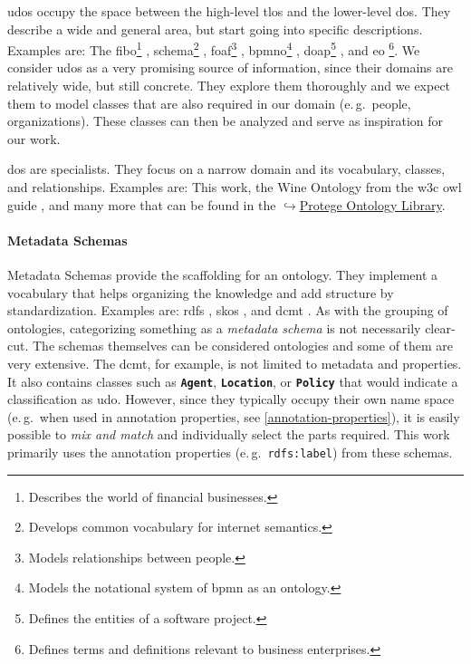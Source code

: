 \documentclass[a4paper, DIV=13, BCOR=0cm]{scrbook}
\newcommand{\eg}{e.\,g.\ }
\newcommand{\class}[1]{\texttt{\textbf{#1}}}
\newcommand{\relation}[1]{\texttt{#1}}
\newcommand{\link}[2]{\href{#1}{$\hookrightarrow$#2}}
\begin{document}
\glspl{udo} occupy the space between the high-level \glspl{tlo} and the lower-level \glspl{do}. They describe a wide and general area, but start going into specific descriptions. Examples are: The %
	\gls{fibo}\footnote{Describes the world of financial businesses.} \cite{fibo-ontology},
	\gls{schema}\footnote{Develops common vocabulary for internet semantics.} \cite{schema-ontology},
	\gls{foaf}\footnote{Models relationships between people.} \cite{Dan-Brickley2014FOAF-Vocabulary},
	\gls{bpmno}\footnote{Models the notational system of \gls{bpmn} as an ontology.} \cite{2014foisbpmn},
	\gls{doap}\footnote{Defines the entities of a software project.} \cite{doap-ontology},
	and \gls{eo} \cite{enterprise-ontology}\footnote{Defines terms and definitions relevant to business enterprises.}.%
We consider \glspl{udo} as a very promising source of information, since their domains are relatively wide, but still concrete. They explore them thoroughly and we expect them to model classes that are also required in our domain (\eg people, organizations). These classes can then be analyzed and serve as inspiration for our work.

\glspl{do} are specialists. They focus on a narrow domain and its vocabulary, classes, and relationships. \cite[p.\,3]{perez1999overview} Examples are: This work, the Wine Ontology from the \gls{w3c} \gls{owl} guide \cite{w3c-owl-guide}, and many more that can be found in the \link{https://protegewiki.stanford.edu/wiki/Protege\_Ontology\_Library}{Protege Ontology Library}.

\paragraph{Metadata Schemas} 
\label{metadata-schemas}
Metadata Schemas provide the scaffolding for an ontology. They implement a vocabulary that helps organizing the knowledge and add structure by standardization. Examples are: \gls{rdfs} \cite{brickley2014rdf}, \gls{skos} \cite{miles2009skos}, and \gls{dcmt} \cite{dublin-core}. As with the grouping of ontologies, categorizing something as a \textit{metadata schema} is not necessarily clear-cut. The schemas themselves can be considered ontologies and some of them are very extensive. The \gls{dcmt}, for example, is not limited to metadata and properties. It also contains classes such as \class{Agent}, \class{Location}, or \class{Policy} that would indicate a classification as \gls{udo}. However, since they typically occupy their own name space (\eg when used in annotation properties, see \autoref{annotation-properties}), it is easily possible to \textit{mix and match} and individually select the parts required. This work primarily uses the annotation properties (\eg \relation{rdfs:label}) from these schemas.
\end{document}
